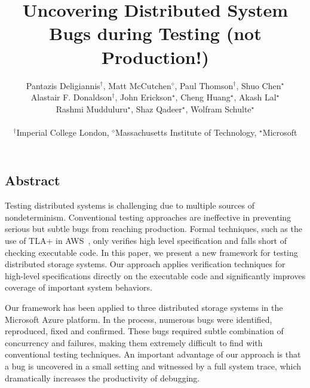 \documentclass[letterpaper,twocolumn,10pt]{article}
\begin{document}
\date{}

\title{\Large \bf Uncovering Distributed System Bugs during Testing (not Production!)}

\author{
{\rm Pantazis Deligiannis$^\dagger$, Matt McCutchen$^\diamond$, Paul Thomson$^\dagger$, Shuo Chen$^\star$}\\
{\rm Alastair F. Donaldson$^\dagger$, John Erickson$^\star$, Cheng Huang$^\star$, Akash Lal$^\star$}\\
{\rm Rashmi Mudduluru$^\star$, Shaz Qadeer$^\star$, Wolfram Schulte$^\star$}\\\\
$^\dagger$Imperial College London, $^\diamond$Massachusetts Institute of Technology, $^\star$Microsoft\\
} %

\maketitle

\thispagestyle{empty}


\subsection*{Abstract}
Testing distributed systems is challenging due to multiple sources of nondeterminism. Conventional testing approaches are ineffective in preventing serious but subtle bugs from reaching production. Formal techniques, such as the use of TLA+ in AWS~\cite{newcombe2015aws}, only verifies high level specification and falls short of checking executable code. In this paper, we present a new framework for testing distributed storage systems.
Our approach applies verification techniques for high-level specifications directly on the executable code and
significantly improves coverage of important system behaviors.

Our framework has been applied to three distributed storage systems in the Microsoft Azure platform.
In the process, numerous bugs were identified, reproduced, fixed and confirmed.
These bugs required subtle combination of concurrency and failures,
making them extremely difficult to find with conventional testing techniques.
An important advantage of our approach is that a bug is uncovered in a small setting and witnessed by a full system trace,
which dramatically increases the productivity of debugging.
\end{document}
